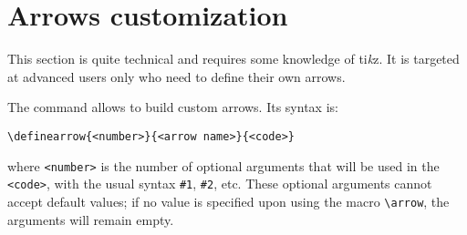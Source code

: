 \documentclass[10pt]{article}
\makeatletter
\newcommand\idx{\@ifstar{\let\print@or@not\@gobble\idx@}{\let\print@or@not\@firstofone\idx@}}
\newcommand\idx@[1]{%
	\ifcat\expandafter\noexpand\@car#1\@nil\relax%
		\expandafter\ifx\@car#1\@nil\protect
			\index{#1}%
			\print@or@not{#1}%
		\else
			\saveexpandmode\expandarg
			\StrSubstitute{\string#1}{\string @}{\@empty\protect\symbol{'100}}[\temp@]%
			\StrGobbleLeft\temp@1[\temp@]%
			\restoreexpandmode
			\expandafter\index\expandafter{\temp@ @\protect\texttt{\protect\textbackslash\temp@}}%
			\print@or@not{\texttt{\string#1}}%
		\fi
	\else
		\index{#1}%
		\print@or@not{#1}%
	\fi
}
\newcommand\TIKZ{ti\textit kz\xspace}
\makeatother
\begin{document}
\section{Arrows customization}\label{definearrow}
This section is quite technical and requires some knowledge of \TIKZ. It is targeted at advanced users  only who need to define their own arrows.

The \idx{\definearrow} command allows to build custom arrows. Its syntax is:

\hfill\verb-\definearrow{<number>}{<arrow name>}{<code>}-\hfill\null

where \verb-<number>- is the number of optional arguments that will be used in the \verb-<code>-, with the usual syntax \verb-#1-, \verb-#2-, etc. These optional arguments cannot accept default values; if no value is specified upon using the macro \verb-\arrow-, the arguments will remain empty.
\end{document}

